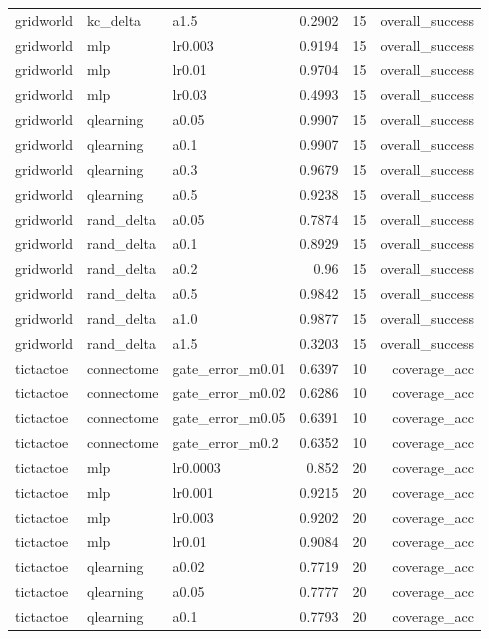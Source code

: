 \begin{table}[t]
\begin{tabular}{lllrrr}
gridworld & kc\_delta & a1.5 & 0.2902 & 15 & overall\_success \\
gridworld & mlp & lr0.003 & 0.9194 & 15 & overall\_success \\
gridworld & mlp & lr0.01 & 0.9704 & 15 & overall\_success \\
gridworld & mlp & lr0.03 & 0.4993 & 15 & overall\_success \\
gridworld & qlearning & a0.05 & 0.9907 & 15 & overall\_success \\
gridworld & qlearning & a0.1 & 0.9907 & 15 & overall\_success \\
gridworld & qlearning & a0.3 & 0.9679 & 15 & overall\_success \\
gridworld & qlearning & a0.5 & 0.9238 & 15 & overall\_success \\
gridworld & rand\_delta & a0.05 & 0.7874 & 15 & overall\_success \\
gridworld & rand\_delta & a0.1 & 0.8929 & 15 & overall\_success \\
gridworld & rand\_delta & a0.2 & 0.96 & 15 & overall\_success \\
gridworld & rand\_delta & a0.5 & 0.9842 & 15 & overall\_success \\
gridworld & rand\_delta & a1.0 & 0.9877 & 15 & overall\_success \\
gridworld & rand\_delta & a1.5 & 0.3203 & 15 & overall\_success \\
tictactoe & connectome & gate\_error\_m0.01 & 0.6397 & 10 & coverage\_acc \\
tictactoe & connectome & gate\_error\_m0.02 & 0.6286 & 10 & coverage\_acc \\
tictactoe & connectome & gate\_error\_m0.05 & 0.6391 & 10 & coverage\_acc \\
tictactoe & connectome & gate\_error\_m0.2 & 0.6352 & 10 & coverage\_acc \\
tictactoe & mlp & lr0.0003 & 0.852 & 20 & coverage\_acc \\
tictactoe & mlp & lr0.001 & 0.9215 & 20 & coverage\_acc \\
tictactoe & mlp & lr0.003 & 0.9202 & 20 & coverage\_acc \\
tictactoe & mlp & lr0.01 & 0.9084 & 20 & coverage\_acc \\
tictactoe & qlearning & a0.02 & 0.7719 & 20 & coverage\_acc \\
tictactoe & qlearning & a0.05 & 0.7777 & 20 & coverage\_acc \\
tictactoe & qlearning & a0.1 & 0.7793 & 20 & coverage\_acc \\

\end{tabular}
\end{table}
